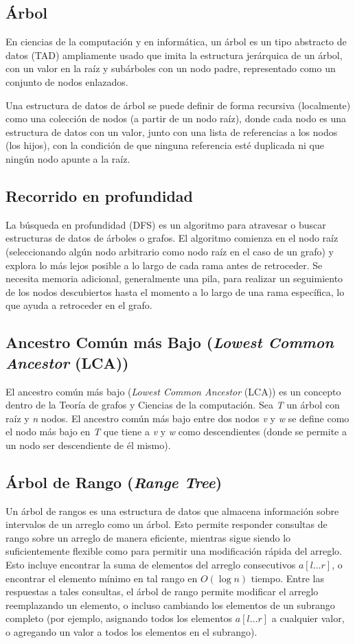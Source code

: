 \subsection{Árbol}
En ciencias de la computación y en informática, un árbol es un tipo abstracto de datos (TAD) ampliamente usado que imita la estructura jerárquica de un árbol, con un valor en la raíz y subárboles con un nodo padre, representado como un conjunto de nodos enlazados.

Una estructura de datos de árbol se puede definir de forma recursiva (localmente) como una colección de nodos (a partir de un nodo raíz), donde cada nodo es una estructura de datos con un valor, junto con una lista de referencias a los nodos (los hijos), con la condición de que ninguna referencia esté duplicada ni que ningún nodo apunte a la raíz. 


\subsection{Recorrido en profundidad}
La búsqueda en profundidad (DFS) es un algoritmo para atravesar o buscar estructuras de datos de árboles o grafos. El algoritmo comienza en el nodo raíz (seleccionando algún nodo arbitrario como nodo raíz en el caso de un grafo) y explora lo más lejos posible a lo largo de cada rama antes de retroceder. Se necesita memoria adicional, generalmente una pila, para realizar un seguimiento de los nodos descubiertos hasta el momento a lo largo de una rama específica, lo que ayuda a retroceder en el grafo.

\subsection{Ancestro Común más Bajo ({\em Lowest Common Ancestor} (LCA))}
El ancestro común más bajo ({\em Lowest Common Ancestor} (LCA)) es un concepto dentro de la Teoría de grafos y Ciencias de la computación. Sea {\em T} un árbol con raíz y {\em n} nodos. El ancestro común más bajo entre dos nodos {\em v} y {\em w} se define como el nodo más bajo en {\em T} que tiene a {\em v} y {\em w} como descendientes (donde se permite a un nodo ser descendiente de él mismo).

\subsection{Árbol de Rango (\emph{Range Tree})}
Un árbol de rangos es una estructura de datos que almacena información sobre intervalos de un arreglo como 
un árbol. Esto permite responder consultas de rango sobre un arreglo de manera eficiente, mientras sigue 
siendo lo suficientemente flexible como para permitir una modificación rápida del arreglo. Esto incluye 
encontrar la suma de elementos del arreglo consecutivos $a[l \dots r]$, o encontrar el elemento mínimo en 
tal rango en $O(\log n)$ tiempo. Entre las respuestas a tales consultas, el árbol de rango permite 
modificar el arreglo reemplazando un elemento, o incluso cambiando los elementos de un subrango completo 
(por ejemplo, asignando todos los elementos $a[l \dots r]$ a cualquier valor, o agregando un valor a todos 
los elementos en el subrango).